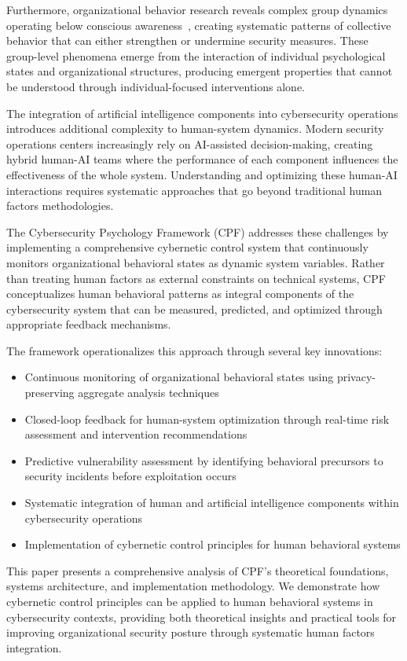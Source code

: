 \documentclass[journal]{IEEEtran}
\begin{document}
Furthermore, organizational behavior research reveals complex group dynamics operating below conscious awareness~\cite{bion1961}, creating systematic patterns of collective behavior that can either strengthen or undermine security measures. These group-level phenomena emerge from the interaction of individual psychological states and organizational structures, producing emergent properties that cannot be understood through individual-focused interventions alone.

The integration of artificial intelligence components into cybersecurity operations introduces additional complexity to human-system dynamics. Modern security operations centers increasingly rely on AI-assisted decision-making, creating hybrid human-AI teams where the performance of each component influences the effectiveness of the whole system. Understanding and optimizing these human-AI interactions requires systematic approaches that go beyond traditional human factors methodologies.

The Cybersecurity Psychology Framework (CPF) addresses these challenges by implementing a comprehensive cybernetic control system that continuously monitors organizational behavioral states as dynamic system variables. Rather than treating human factors as external constraints on technical systems, CPF conceptualizes human behavioral patterns as integral components of the cybersecurity system that can be measured, predicted, and optimized through appropriate feedback mechanisms.

The framework operationalizes this approach through several key innovations:
\begin{itemize}
\item Continuous monitoring of organizational behavioral states using privacy-preserving aggregate analysis techniques
\item Closed-loop feedback for human-system optimization through real-time risk assessment and intervention recommendations  
\item Predictive vulnerability assessment by identifying behavioral precursors to security incidents before exploitation occurs
\item Systematic integration of human and artificial intelligence components within cybersecurity operations
\item Implementation of cybernetic control principles for human behavioral systems
\end{itemize}

This paper presents a comprehensive analysis of CPF's theoretical foundations, systems architecture, and implementation methodology. We demonstrate how cybernetic control principles can be applied to human behavioral systems in cybersecurity contexts, providing both theoretical insights and practical tools for improving organizational security posture through systematic human factors integration.
\end{document}
